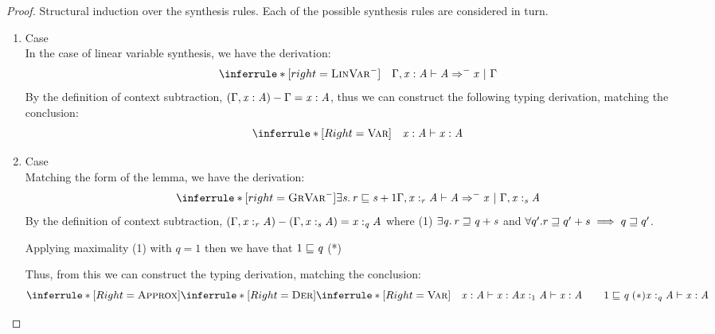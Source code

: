 \begin{proof}
Structural induction over the synthesis rules. Each of the possible synthesis
rules are considered in turn.

\begin{enumerate}[itemsep=1em]
  \item Case \subLinVarName \\
  In the case of linear variable synthesis, we have the derivation:
  \[
    \subLinVar{}
  \]
  By the definition of context subtraction,
  $(\Gamma  \GRANULEsym{,}   \GRANULEmv{x}  :  \GRANULEnt{A}) - \Gamma = \GRANULEmv{x}  :  \GRANULEnt{A}$, thus we
  can construct the following typing derivation, matching the
  conclusion:
  \[
    \inferrule*[Right=\textsc{Var}]
    {\quad}
    {\GRANULEmv{x}  :  \GRANULEnt{A}   \vdash  \GRANULEmv{x}  :  \GRANULEnt{A}}
  \]

\item Case \subGrVarName{} \\
    Matching the form of the lemma, we have the derivation:
    \[
    \subGrVar{}
    \]
    By the definition of context subtraction,
    $ \GRANULEsym{(}  \Gamma  \GRANULEsym{,}   \GRANULEmv{x}  :_{\textcolor{coeffectColor}{  \GRANULEnt{r}  } }   \GRANULEnt{A}   \GRANULEsym{)}  \GRANULEsym{-}  \GRANULEsym{(}  \Gamma  \GRANULEsym{,}   \GRANULEmv{x}  :_{\textcolor{coeffectColor}{  \GRANULEnt{s}  } }   \GRANULEnt{A}   \GRANULEsym{)} = \GRANULEmv{x}  :_{\textcolor{coeffectColor}{  \GRANULEnt{q}  } }   \GRANULEnt{A}$
    where (1) $\exists  \GRANULEnt{q}  .\,   \GRANULEnt{r}  \sqsupseteq  \GRANULEnt{q}  \GRANULEsym{+}  \GRANULEnt{s}$ and $\maximal{q}{q'}{r}{q' + s}$.

    Applying maximality (1) with $q = 1$ then we have that $1 \sqsubseteq \GRANULEnt{q}$ (*)

    Thus, from this we can construct the typing derivation, matching the conclusion:
    \[
    \inferrule*[Right=\textsc{Approx}]
    {
      \inferrule*[Right=\textsc{Der}]
        {\inferrule*[Right=\textsc{Var}]
          {\quad}
          {\GRANULEmv{x}  :  \GRANULEnt{A}   \vdash  \GRANULEmv{x}  :  \GRANULEnt{A}}
        }
        {\GRANULEmv{x}  :_{\textcolor{coeffectColor}{   1   } }   \GRANULEnt{A}   \vdash  \GRANULEmv{x}  :  \GRANULEnt{A} \qquad 1 \sqsubseteq \GRANULEnt{q} \; (*)}
    }{
      \GRANULEmv{x}  :_{\textcolor{coeffectColor}{  \GRANULEnt{q}  } }   \GRANULEnt{A}   \vdash  \GRANULEmv{x}  :  \GRANULEnt{A}
    }
    \]


\end{enumerate}
\end{proof}
